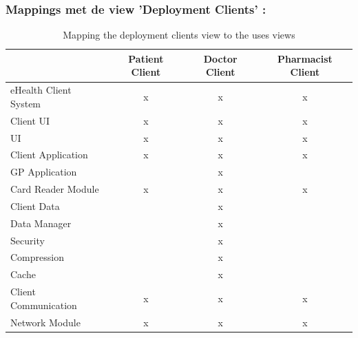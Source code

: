 \documentclass[a4paper,10pt]{article}
\begin{document}
\subsubsection*{Mappings met de view 'Deployment Clients' : }
\begin{table}[h!]
\begin{center}
 \begin{tabular}{l| c | c | c |} 
 & Patient Client & Doctor Client & Pharmacist Client \\ \hline
eHealth Client System & x & x & x \\ \hline
\hspace{6pt}Client UI & x & x & x \\ \hline
\hspace{12pt}UI & x & x & x \\ \hline
\hspace{6pt}Client Application & x & x & x \\ \hline
\hspace{12pt}GP Application & & x & \\ \hline
\hspace{12pt}Card Reader Module & x & x & x \\ \hline
\hspace{6pt}Client Data & & x & \\ \hline
\hspace{12pt}Data Manager & & x & \\ \hline
\hspace{12pt}Security & & x & \\ \hline
\hspace{12pt}Compression & & x & \\ \hline
\hspace{12pt}Cache & & x & \\ \hline
\hspace{6pt}Client Communication & x & x & x \\ \hline
\hspace{12pt}Network Module & x & x & x \\ \hline
\end{tabular}
\caption{Mapping the deployment clients view to the uses views}
\end{center}
\end{table}

\clearpage
\end{document}
